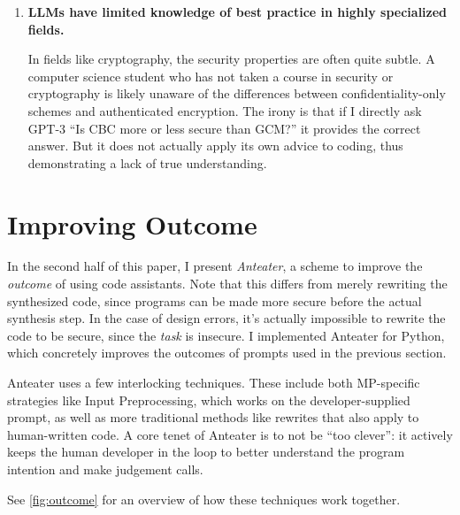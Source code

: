 \documentclass[sigplan,screen,nonacm]{acmart}
\begin{document}
\begin{enumerate}
    \item \textbf{LLMs have limited knowledge of best practice in highly specialized fields.}

        In fields like cryptography, the security properties are often quite subtle. A computer science student who has not taken a course in security or cryptography is likely unaware of the differences between confidentiality-only schemes and authenticated encryption. The irony is that if I directly ask GPT-3 ``Is CBC more or less secure than GCM?'' it provides the correct answer. But it does not actually apply its own advice to coding, thus demonstrating a lack of true understanding. 
\end{enumerate}


\section{Improving Outcome} \label{sec:improve}

In the second half of this paper, I present \emph{Anteater}, a scheme to improve the \emph{outcome} of using code assistants. Note that this differs from merely rewriting the synthesized code, since programs can be made more secure before the actual synthesis step. In the case of design errors, it's actually impossible to rewrite the code to be secure, since the \emph{task} is insecure. I implemented Anteater for Python, which concretely improves the outcomes of prompts used in the previous section.

Anteater uses a few interlocking techniques. These include both MP-specific strategies like Input Preprocessing, which works on the developer-supplied prompt, as well as more traditional methods like rewrites that also apply to human-written code. A core tenet of Anteater is to not be ``too clever'': it actively keeps the human developer in the loop to better understand the program intention and make judgement calls.

See \cref{fig:outcome} for an overview of how these techniques work together.
\end{document}
